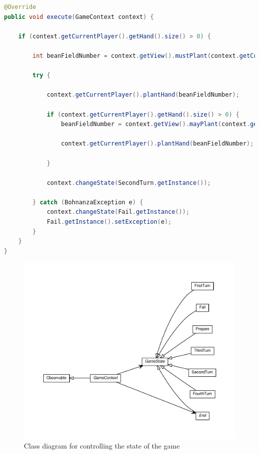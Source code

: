 \begin{lstlisting}[language=Java, caption=FirstTurn.execute()]
@Override
public void execute(GameContext context) {

    if (context.getCurrentPlayer().getHand().size() > 0) {

        int beanFieldNumber = context.getView().mustPlant(context.getCurrentPlayer());

        try {

            context.getCurrentPlayer().plantHand(beanFieldNumber);
 
            if (context.getCurrentPlayer().getHand().size() > 0) {
                beanFieldNumber = context.getView().mayPlant(context.getCurrentPlayer());

                context.getCurrentPlayer().plantHand(beanFieldNumber);

            }

            context.changeState(SecondTurn.getInstance());

        } catch (BohnanzaException e) {
            context.changeState(Fail.getInstance());
            Fail.getInstance().setException(e);
        }
    }
}
\end{lstlisting}

\begin{figure}[h!]
    \includegraphics[width=\textwidth]{../umlgraph/StateGraph}
    \caption{Class diagram for controlling the state of the game}
    \label{fig:design:controller}
\end{figure}

